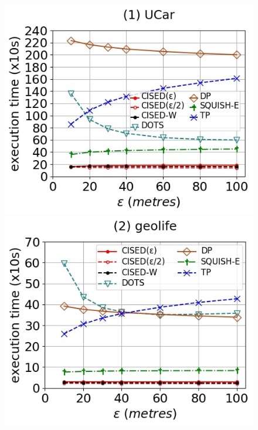 {\begin{figure}[tb!]
	\centering
	\includegraphics[scale=0.250]{Figures/Exp-SED-time-epsilon-service.jpg}	\hspace{0.5ex}
	\includegraphics[scale=0.250]{Figures/Exp-SED-time-epsilon-geolife.jpg}	\hspace{0.5ex}

\end{figure}}
